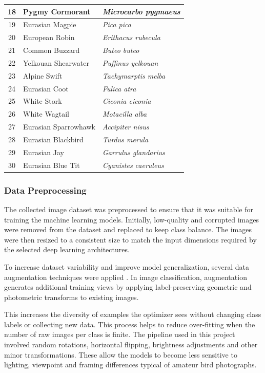 \begin{table}[H]
\begin{tabular}{|c|l|l|}
18 & Pygmy Cormorant & \textit{Microcarbo pygmaeus} \\ \hline
19 & Eurasian Magpie & \textit{Pica pica} \\ \hline
20 & European Robin & \textit{Erithacus rubecula} \\ \hline
21 & Common Buzzard & \textit{Buteo buteo} \\ \hline
22 & Yelkouan Shearwater & \textit{Puffinus yelkouan} \\ \hline
23 & Alpine Swift & \textit{Tachymarptis melba} \\ \hline
24 & Eurasian Coot & \textit{Fulica atra} \\ \hline
25 & White Stork & \textit{Ciconia ciconia} \\ \hline
26 & White Wagtail & \textit{Motacilla alba} \\ \hline
27 & Eurasian Sparrowhawk & \textit{Accipiter nisus} \\ \hline
28 & Eurasian Blackbird & \textit{Turdus merula} \\ \hline
29 & Eurasian Jay & \textit{Garrulus glandarius} \\ \hline
30 & Eurasian Blue Tit & \textit{Cyanistes caeruleus} \\ \hline
\end{tabular}
\end{table}

\subsubsection{Data Preprocessing}

The collected image dataset was preprocessed to ensure that it was suitable for
training the machine learning models. Initially, low-quality and corrupted images
were removed from the dataset and replaced to keep class balance. The images were 
then resized to a consistent size to match the input dimensions required by the 
selected deep learning architectures.

To increase dataset variability and improve model generalization, several data
augmentation techniques were applied \cite{shorten2019survey}.
In image classification, augmentation generates additional training views by applying
label-preserving geometric and photometric transforms to existing images.

This increases the diversity of examples the optimizer sees without changing class labels or collecting new data. 
This process helps to reduce over-fitting when the number of raw images per class is finite.
The pipeline used in this project involved random rotations, horizontal flipping, brightness adjustments and other minor transformations.
These allow the models to become less sensitive to lighting, viewpoint and framing differences typical of amateur bird photographs.

